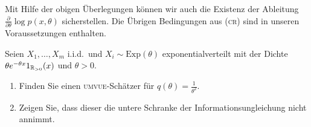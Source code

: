 Mit Hilfe der obigen Überlegungen können wir auch die Existenz der Ableitung 
$\frac{\partial}{\partial \theta} \log p(x,\theta)$ sicherstellen.
Die Übrigen Bedingungen aus (\textsc{cr}) sind in unseren Voraussetzungen enthalten.






Seien $X_1,\ldots,X_m$ i.i.d.\ und $X_i\sim \textrm{Exp}(\theta)$
exponentialverteilt mit der Dichte $\theta e^{-\theta x}1_{\mathbb R_{>0}}(x)$ und
$\theta>0$.
\begin{enumerate}
    \item Finden Sie einen \textsc{umvue}-Schätzer für $q(\theta) =
        \frac{1}{\theta^2}$.
    \item Zeigen Sie, dass dieser die untere Schranke der Informationsungleichung
        nicht annimmt.
\end{enumerate}
 

